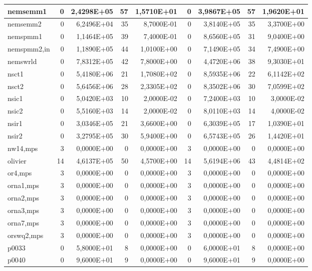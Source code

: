 \begin{tabular}{|l|r|r|r|r|r|r|r|r|}
nemsemm1 & 0 & 2,4298E+05 & 57 & 1,5710E+01 & 0 & 3,9867E+05 & 57 & 1,9620E+01 \\ \hline
nemsemm2 & 0 & 6,2496E+04 & 35 & 8,7000E-01 & 0 & 3,8140E+05 & 35 & 3,3700E+00 \\ \hline
nemspmm1 & 0 & 1,1464E+05 & 39 & 7,4000E-01 & 0 & 8,6560E+05 & 31 & 9,0400E+00 \\ \hline
nemspmm2,in & 0 & 1,1890E+05 & 44 & 1,0100E+00 & 0 & 7,1490E+05 & 34 & 7,4900E+00 \\ \hline
nemswrld & 0 & 7,8312E+05 & 42 & 7,8000E+00 & 0 & 4,4720E+06 & 38 & 9,3030E+01 \\ \hline
nsct1 & 0 & 5,4180E+06 & 21 & 1,7080E+02 & 0 & 8,5935E+06 & 22 & 6,1142E+02 \\ \hline
nsct2 & 0 & 5,6456E+06 & 28 & 2,3305E+02 & 0 & 8,3502E+06 & 30 & 7,0599E+02 \\ \hline
nsic1 & 0 & 5,0420E+03 & 10 & 2,0000E-02 & 0 & 7,2400E+03 & 10 & 3,0000E-02 \\ \hline
nsic2 & 0 & 5,5160E+03 & 14 & 2,0000E-02 & 0 & 8,0110E+03 & 14 & 4,0000E-02 \\ \hline
nsir1 & 0 & 3,0346E+05 & 21 & 3,6600E+00 & 0 & 6,3039E+05 & 17 & 1,0390E+01 \\ \hline
nsir2 & 0 & 3,2795E+05 & 30 & 5,9400E+00 & 0 & 6,5743E+05 & 26 & 1,4420E+01 \\ \hline
nw14,mps & 3 & 0,0000E+00 & 0 & 0,0000E+00 & 3 & 0,0000E+00 & 0 & 0,0000E+00 \\ \hline
olivier & 14 & 4,6137E+05 & 50 & 4,5700E+00 & 14 & 5,6194E+06 & 43 & 4,4814E+02 \\ \hline
or4,mps & 3 & 0,0000E+00 & 0 & 0,0000E+00 & 3 & 0,0000E+00 & 0 & 0,0000E+00 \\ \hline
orna1,mps & 3 & 0,0000E+00 & 0 & 0,0000E+00 & 3 & 0,0000E+00 & 0 & 0,0000E+00 \\ \hline
orna2,mps & 3 & 0,0000E+00 & 0 & 0,0000E+00 & 3 & 0,0000E+00 & 0 & 0,0000E+00 \\ \hline
orna3,mps & 3 & 0,0000E+00 & 0 & 0,0000E+00 & 3 & 0,0000E+00 & 0 & 0,0000E+00 \\ \hline
orna7,mps & 3 & 0,0000E+00 & 0 & 0,0000E+00 & 3 & 0,0000E+00 & 0 & 0,0000E+00 \\ \hline
orswq2,mps & 3 & 0,0000E+00 & 0 & 0,0000E+00 & 3 & 0,0000E+00 & 0 & 0,0000E+00 \\ \hline
p0033 & 0 & 5,8000E+01 & 8 & 0,0000E+00 & 0 & 6,0000E+01 & 8 & 0,0000E+00 \\ \hline
p0040 & 0 & 9,6000E+01 & 9 & 0,0000E+00 & 0 & 9,6000E+01 & 9 & 0,0000E+00 \\ \hline

\end{tabular}
